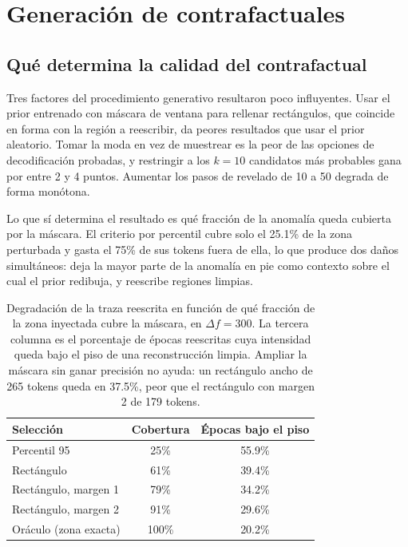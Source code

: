 \section{Generación de contrafactuales}
\label{sec:res_contrafactuales}

\subsection{Qué determina la calidad del contrafactual}

Tres factores del procedimiento generativo resultaron poco influyentes. Usar el prior entrenado con máscara de ventana para rellenar rectángulos, que coincide en forma con la región a reescribir, da peores resultados que usar el prior aleatorio. Tomar la moda en vez de muestrear es la peor de las opciones de decodificación probadas, y restringir a los $k = 10$ candidatos más probables gana por entre 2 y 4 puntos. Aumentar los pasos de revelado de 10 a 50 degrada de forma monótona.

Lo que sí determina el resultado es qué fracción de la anomalía queda cubierta por la máscara. El criterio por percentil cubre solo el 25.1\% de la zona perturbada y gasta el 75\% de sus tokens fuera de ella, lo que produce dos daños simultáneos: deja la mayor parte de la anomalía en pie como contexto sobre el cual el prior redibuja, y reescribe regiones limpias.

\begin{table}[H]
\centering
\begin{tabular}{|l|c|c|}
\hline
\textbf{Selección} & \textbf{Cobertura} & \textbf{Épocas bajo el piso} \\
\hline
Percentil 95            & 25\%  & 55.9\% \\
Rectángulo              & 61\%  & 39.4\% \\
Rectángulo, margen 1    & 79\%  & 34.2\% \\
Rectángulo, margen 2    & 91\%  & 29.6\% \\
Oráculo (zona exacta)   & 100\% & 20.2\% \\
\hline
\end{tabular}
\caption{Degradación de la traza reescrita en función de qué fracción de la zona inyectada cubre la máscara, en $\Delta f = 300$. La tercera columna es el porcentaje de épocas reescritas cuya intensidad queda bajo el piso de una reconstrucción limpia. Ampliar la máscara sin ganar precisión no ayuda: un rectángulo ancho de 265 tokens queda en 37.5\%, peor que el rectángulo con margen 2 de 179 tokens.}
\label{tab:cobertura}
\end{table}

